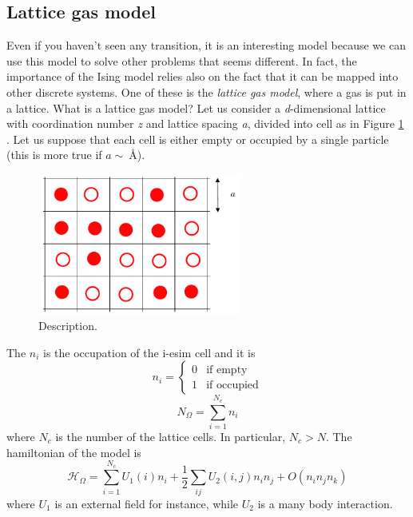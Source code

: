 \documentclass[../main/main.tex]{subfiles}
\begin{document}
\subsection{Lattice gas model}
Even if you haven't seen any transition, it is an interesting model because we can use this model to solve other problems that seems different. In fact, the importance of the Ising model relies also on the fact that it can be mapped into other discrete systems. One of these is the \emph{lattice gas model}, where a gas is put in a lattice.
 What is a lattice gas model?
 Let us consider a \emph{d}-dimensional lattice with coordination number \emph{z} and lattice spacing \emph{a}, divided into cell as in Figure \ref{fig:6_1} . Let us suppose that each cell is either empty or occupied by a single particle (this is more true if \( a \sim \SI{}{\angstrom}  \)).
 \begin{figure}[h!]
 \centering
 \includegraphics[width=0.6\textwidth]{../lessons/6_image/1.pdf}
 \caption{\label{fig:6_1} Description.}
 \end{figure}
 The \( n_i \) is the occupation of the i-esim cell and it is
\begin{equation}
n_i =
  \begin{cases}
   0 & \text{if empty} \\
   1 & \text{if occupied}
  \end{cases}
\end{equation}
\begin{equation}
  N _ \Omega = \sum_{i=1}^{N_c} n_i
\end{equation}
where \( N_c \) is the number of the lattice cells. In particular, \( N_c > N \).
The hamiltonian of the model is
\begin{equation}
  \mathcal{H}_ \Omega  = \sum_{i=1}^{N_c} U_1 (i) n_i + \frac{1}{2} \sum_{ij}^{} U_2 (i,j) n_i n_j + O (n_i n_j n_k)
\end{equation}
where \( U_1 \) is an external field for instance, while \( U_2 \) is a many body interaction.
\end{document}
